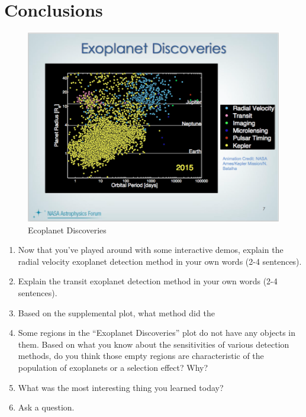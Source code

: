 \documentclass[12pt]{article}%
\begin{document}
\section{Conclusions}
\begin{figure}
    \centering
    \includegraphics[width=\textwidth]{Batalha_plot.png}
    \caption{Ecoplanet Discoveries}
    \label{fig:my_label}
\end{figure}
\begin{enumerate}
\item Now that you've played around with some interactive demos, explain the radial velocity exoplanet detection method in your own words (2-4 sentences).
\item Explain the transit exoplanet detection method in your own words (2-4 sentences).
\item Based on the supplemental plot, what method did the 
\item Some regions in the ``Exoplanet Discoveries'' plot do not have any objects in them. 
Based on what you know about the sensitivities of various detection methods, do you think those empty regions are characteristic of the population of exoplanets or a selection effect? Why?
\item What was the most interesting thing you learned today?
\item Ask a question.
\end{enumerate}
\end{document}
